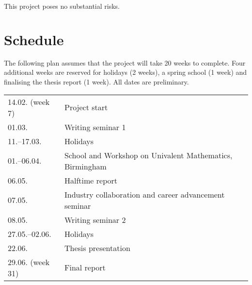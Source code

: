 \documentclass{scrartcl}
\begin{document}
This project poses no substantial risks.


\section{Schedule}

The following plan assumes that the project will take 20 weeks to complete.
Four additional weeks are reserved for holidays (2 weeks), a spring school
(1 week) and finalising the thesis report (1 week). All dates are preliminary.

\begin{tabular}{ll}
  14.02. (week 7) & Project start \\
  01.03. & Writing seminar 1 \\
  11.--17.03. & Holidays \\
  01.--06.04. & School and Workshop on Univalent Mathematics, Birmingham \\
  06.05. & Halftime report \\
  07.05. & Industry collaboration and career advancement seminar \\
  08.05. & Writing seminar 2 \\
  27.05.--02.06. & Holidays \\
  22.06. & Thesis presentation \\
  29.06. (week 31) & Final report
\end{tabular}





\end{document}

